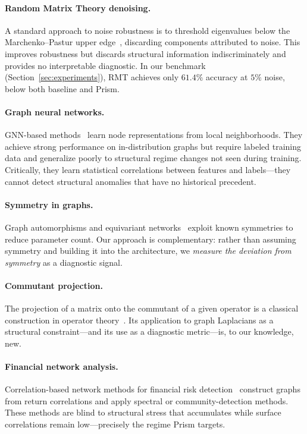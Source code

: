 \documentclass[11pt]{article}
\begin{document}
\paragraph{Random Matrix Theory denoising.}
A standard approach to noise robustness is to threshold eigenvalues below
the Marchenko--Pastur upper edge~\cite{Marchenko1967}, discarding
components attributed to noise.
This improves robustness but discards structural information indiscriminately
and provides no interpretable diagnostic.
In our benchmark (Section~\ref{sec:experiments}), RMT achieves only
$61.4\%$ accuracy at $5\%$ noise, below both baseline and Prism.

\paragraph{Graph neural networks.}
GNN-based methods~\cite{Kipf2017,Hamilton2017} learn node representations
from local neighborhoods.
They achieve strong performance on in-distribution graphs but require
labeled training data and generalize poorly to structural regime changes
not seen during training.
Critically, they learn statistical correlations between features and
labels---they cannot detect structural anomalies that have no historical
precedent.

\paragraph{Symmetry in graphs.}
Graph automorphisms and equivariant networks~\cite{Maron2019} exploit
known symmetries to reduce parameter count.
Our approach is complementary: rather than assuming symmetry and building
it into the architecture, we \emph{measure the deviation from symmetry}
as a diagnostic signal.

\paragraph{Commutant projection.}
The projection of a matrix onto the commutant of a given operator is a
classical construction in operator theory~\cite{Halmos1982}.
Its application to graph Laplacians as a structural constraint---and its
use as a diagnostic metric---is, to our knowledge, new.

\paragraph{Financial network analysis.}
Correlation-based network methods for financial risk
detection~\cite{Mantegna1999,Onnela2003} construct graphs from return
correlations and apply spectral or community-detection methods.
These methods are blind to structural stress that accumulates while
surface correlations remain low---precisely the regime Prism targets.
\end{document}
